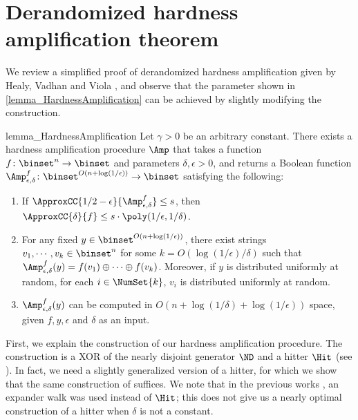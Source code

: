 \documentclass{toc}
\begin{document}
%
%
%
%
%
%
%
%
%
%
%
%
%
%
%
%
%
%
%
%
%
%
%
%
%
%
%
%
%
%
%
%
%
%
%
%

\appendix

\section{Derandomized hardness amplification theorem}
\label{section_HardnessAmplification}

We review a simplified proof of derandomized hardness amplification given by Healy, Vadhan and Viola \cite{HealyVV06_siamcomp_journals}, and observe that the parameter shown in \cref{lemma_HardnessAmplification} can be achieved by slightly modifying the construction.

\begin{theoremref}
  {lemma_HardnessAmplification}
  Let $\gamma > 0$ be an arbitrary constant.
  There exists a hardness amplification procedure $\Amp$
  that takes a function $f \colon \binset^n \to \binset$ and parameters $\delta, \epsilon > 0$,
  and returns
  a Boolean function
  $\Amp_{\epsilon, \delta}^f \colon \binset^{O(n + \log (1/\epsilon))} \to \binset$
  satisfying the following:
  \begin{enumerate}
    \item
          If $\ApproxCC{1/2 - \epsilon}{\Amp_{\epsilon, \delta}^f} \le s$,
          then
          $\ApproxCC{\delta}{f} \le s \cdot \poly(1/\epsilon, 1/\delta)$.
    \item
          For any fixed $y \in \binset^{O(n + \log (1 / \epsilon))}$,
          there exist strings $v_1, \cdots, v_k \in \binset^{n}$
          for some $k = O(\log (1 / \epsilon) / \delta)$
          such that
          $\Amp_{\epsilon, \delta}^f(y) =  f(v_1) \oplus \cdots \oplus f(v_k)$.
          Moreover, if $y$ is distributed uniformly at random,
          for each $i \in \NumSet{k}$,
          $v_i$ is distributed uniformly at random.
    \item
          $\Amp_{\epsilon, \delta}^f(y)$ can be computed in $O(n + \log (1 / \delta) + \log (1 / \epsilon))$ space,
          given $f, y, \epsilon$ and $\delta$ as an input.
  \end{enumerate}

\end{theoremref}


First, we explain the construction of our hardness amplification procedure.
The construction is
a XOR of the nearly disjoint generator $\ND$ and a hitter $\Hit$
%
(see \cite{Goldreich11j_goldreich2011_sp_books}). %
In fact, we need a slightly generalized version of a hitter, for which we show that the same construction of \cite{Goldreich11j_goldreich2011_sp_books} suffices.
We note that in the previous works \cite{ImpagliazzoW97_stoc_conf, HealyVV06_siamcomp_journals}, an expander walk was used instead of $\Hit$;
this does not give us a nearly optimal construction of a hitter when $\delta$ is not a constant. %
\end{document}
